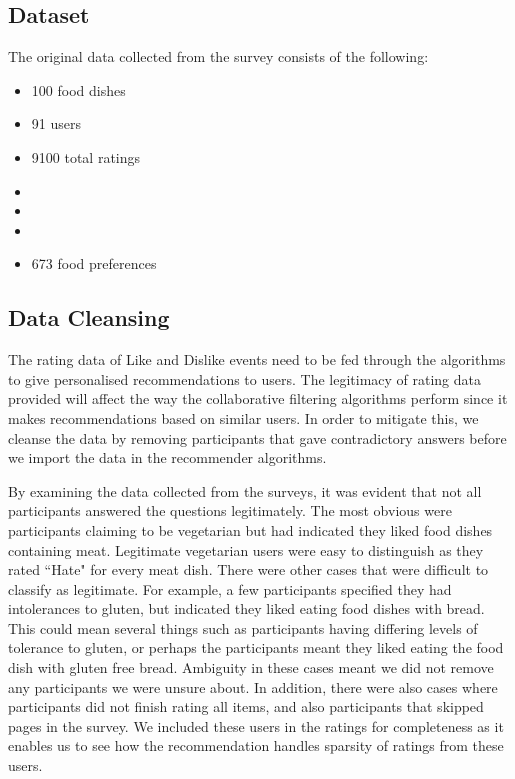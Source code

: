\subsection{Dataset}
The original data collected from the survey consists of the following:
\begin{itemize}
	\item{100 food dishes}
	\item{91 users}
	\item{9100 total ratings}
	\item{} 
	\item{}
	\item{}
	\item{673 food preferences}
\end{itemize}


\subsection{Data Cleansing}

The rating data of Like and Dislike events need to be fed through the algorithms to give personalised recommendations to users. The legitimacy of rating data provided will affect the way the collaborative filtering algorithms perform since it makes recommendations based on similar users. In order to mitigate this, we cleanse the data by removing participants that gave contradictory answers before we import the data in the recommender algorithms.


By examining the data collected from the surveys, it was evident that not all participants answered the questions legitimately. The most obvious were participants claiming to be vegetarian but had indicated they liked food dishes containing meat. Legitimate vegetarian users were easy to distinguish as they rated ``Hate" for every meat dish. There were other cases that were difficult to classify as legitimate. For example, a few participants specified they had intolerances to gluten, but indicated they liked eating food dishes with bread. This could mean several things such as participants having differing levels of tolerance to gluten, or perhaps the participants meant they liked eating the food dish with gluten free bread. Ambiguity in these cases meant we did not remove any participants we were unsure about. In addition, there were also cases where participants did not finish rating all items, and also participants that skipped pages in the survey. We included these users in the ratings for completeness as it enables us to see how the recommendation handles sparsity of ratings from these users. 


